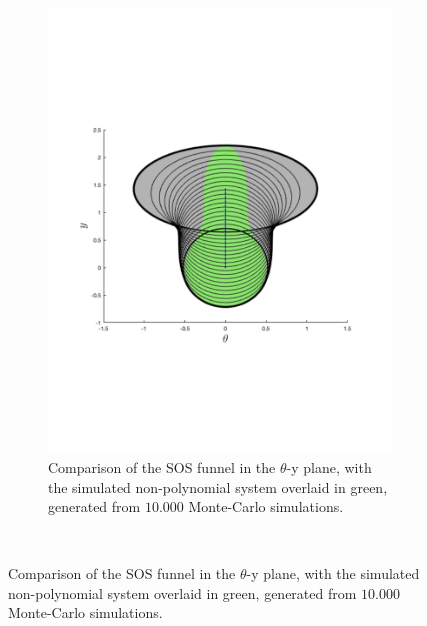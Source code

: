 \begin{figure}
\begin{subfigure}{0.5\textwidth}
    \includegraphics[trim={0cm 6cm 0cm 6cm},
    width=.95\textwidth]{figures/method/FunnelSimythetafunnel}
    \caption{Comparison of the \ac{SOS} funnel in the \(\theta\)-y plane, with
      the simulated non-polynomial system overlaid in green, generated from
      \(10.000\) Monte-Carlo simulations.}
  \end{subfigure}%
  \\
\end{figure}

